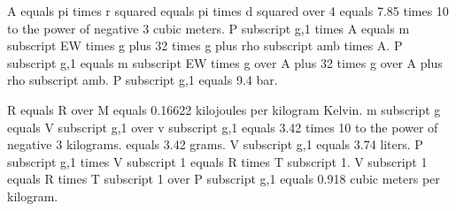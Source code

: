 A equals pi times r squared equals pi times d squared over 4 equals 7.85 times 10 to the power of negative 3 cubic meters.
P subscript g,1 times A equals m subscript EW times g plus 32 times g plus rho subscript amb times A.
P subscript g,1 equals m subscript EW times g over A plus 32 times g over A plus rho subscript amb.
P subscript g,1 equals 9.4 bar.

R equals R over M equals 0.16622 kilojoules per kilogram Kelvin.
m subscript g equals V subscript g,1 over v subscript g,1 equals 3.42 times 10 to the power of negative 3 kilograms.
equals 3.42 grams.
V subscript g,1 equals 3.74 liters.
P subscript g,1 times V subscript 1 equals R times T subscript 1.
V subscript 1 equals R times T subscript 1 over P subscript g,1 equals 0.918 cubic meters per kilogram.
